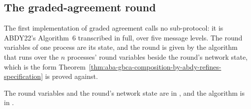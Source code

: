 \subsection{The graded-agreement round}

The first implementation of graded agreement calls no sub-protocol: it is
ABDY22's Algorithm~6 transcribed in full, over five message levels.
The round variables of one process are its state, and the round is given by the algorithm that runs
over the $n$ processes' round variables beside the round's network state, which is the form
Theorem~\ref{thm:aba-gbca-composition-by-abdy-refines-specification} is proved against.

The round variables and the round's network state are in
, and the algorithm is in
.



